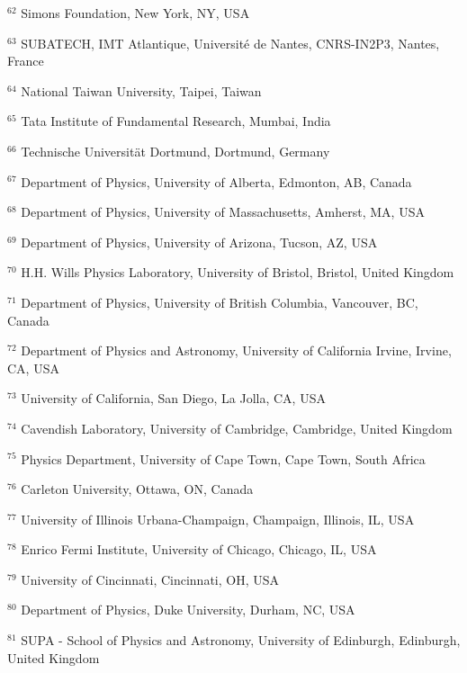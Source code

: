\par {\footnotesize $^{62}$ Simons Foundation, New York, NY, USA}
\par {\footnotesize $^{63}$ SUBATECH, IMT Atlantique, Université de Nantes, CNRS-IN2P3, Nantes, France}
\par {\footnotesize $^{64}$ National Taiwan University, Taipei, Taiwan}
\par {\footnotesize $^{65}$ Tata Institute of Fundamental Research, Mumbai, India}
\par {\footnotesize $^{66}$ Technische Universit\"at Dortmund, Dortmund, Germany}
\par {\footnotesize $^{67}$ Department of Physics, University of Alberta, Edmonton, AB, Canada}
\par {\footnotesize $^{68}$ Department of Physics, University of Massachusetts, Amherst, MA, USA}
\par {\footnotesize $^{69}$ Department of Physics, University of Arizona, Tucson, AZ, USA}
\par {\footnotesize $^{70}$ H.H. Wills Physics Laboratory, University of Bristol, Bristol, United Kingdom}
\par {\footnotesize $^{71}$ Department of Physics, University of British Columbia, Vancouver, BC, Canada}
\par {\footnotesize $^{72}$ Department of Physics and Astronomy, University of California Irvine, Irvine, CA, USA}
\par {\footnotesize $^{73}$ University of California, San Diego, La Jolla, CA, USA}
\par {\footnotesize $^{74}$ Cavendish Laboratory, University of Cambridge, Cambridge, United Kingdom}
\par {\footnotesize $^{75}$ Physics Department, University of Cape Town, Cape Town, South Africa}
\par {\footnotesize $^{76}$ Carleton University, Ottawa, ON, Canada}
\par {\footnotesize $^{77}$ University of Illinois Urbana-Champaign, Champaign, Illinois, IL, USA}
\par {\footnotesize $^{78}$ Enrico Fermi Institute, University of Chicago, Chicago, IL, USA}
\par {\footnotesize $^{79}$ University of Cincinnati, Cincinnati, OH, USA}
\par {\footnotesize $^{80}$ Department of Physics, Duke University, Durham, NC, USA}
\par {\footnotesize $^{81}$ SUPA - School of Physics and Astronomy, University of Edinburgh, Edinburgh, United Kingdom}
